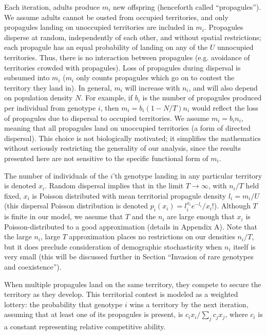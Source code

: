 \documentclass[11pt]{article}
\begin{document}
Each iteration, adults produce $m_i$ new offspring (henceforth called ``propagules''). We assume adults cannot be ousted from occupied territories, and only propagules landing on unoccupied territories are included in $m_i$. Propagules disperse at random, independently of each other, and without spatial restrictions; each propagule has an equal probability of landing on any of the $U$ unnocupied territories. Thus, there is no interaction between propagules (e.g. avoidance of territories crowded with propagules). Loss of propagules during dispersal is subsumed into $m_i$ ($m_i$ only counts propagules which go on to contest the territory they land in). In general, $m_i$ will increase with $n_i$, and will also depend on population density $N$. For example, if $b_i$ is the number of propagules produced per individual from genotype $i$, then $m_i=b_i(1-N/T)n_i$ would reflect the loss of propagules due to dispersal to occupied territories. We assume $m_i=b_i n_i$, meaning that all propagules land on unoccupied territories (a form of directed dispersal). This choice is not biologically motivated; it simplifies the mathematics without seriously restricting the generality of our analysis, since the results presented here are not sensitive to the specific functional form of $m_i$. 

The number of individuals of the $i$'th genotype landing in any particular territory is denoted $x_i$. Random dispersal implies that in the limit $T\rightarrow \infty$, with $n_i/T$ held fixed, $x_i$ is Poisson distributed with mean territorial propagule density $l_i=m_i/U$ (this dispersal Poisson distribution is denoted $p_i(x_i)=l_i^{x_i} e^{-l_i}/x_i!$). Although $T$ is finite in our model, we assume that $T$ and the $n_i$ are large enough that $x_i$ is Poisson-distributed to a good approximation (details in Appendix A).  Note that the large $n_i$, large $T$ approximation places no restrictions on our densities $n_i/T$, but it does preclude consideration of demographic stochasticity when $n_i$ itself is very small (this will be discussed further in Section ``Invasion of rare genotypes and coexistence'').

When multiple propagules land on the same territory, they compete to secure the territory as they develop. This territorial contest is modeled as a weighted lottery: the probability that genotype $i$ wins a territory by the next iteration, assuming that at least one of its propagules is present, is $c_i x_i/\sum_j c_j x_j$, where $c_i$ is a constant representing relative competitive ability. 
\end{document}
